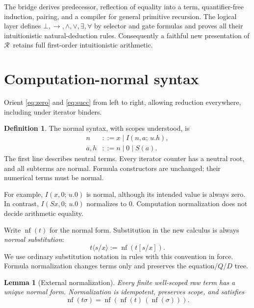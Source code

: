 \documentclass[11pt]{article}
\newtheorem{lemma}[theorem]{Lemma}
\theoremstyle{definition}
\newtheorem{definition}[theorem]{Definition}
\newcommand{\Raw}{\ensuremath{\mathcal R}}
\newcommand{\nf}[1]{\operatorname{nf}(#1)}
\newcommand{\I}[3]{I(#1,#2;\,#3)}
\newcommand{\bnf}{\mathrel{::=}}
\begin{document}
The bridge derives predecessor, reflection of equality into a term,
quantifier-free induction, pairing, and a compiler for general
primitive recursion. The logical layer defines
$\bot,\to,\land,\lor,\exists,\forall$ by selector and gate formulas and
proves all their intuitionistic natural-deduction rules.
Consequently a faithful new presentation of \Raw\ retains full
first-order intuitionistic arithmetic.

\section{Computation-normal syntax}
\label{sec:normal}

Orient \eqref{eq:zero} and \eqref{eq:succ} from left to right, allowing
reduction everywhere, including under iterator binders.

\begin{definition}
The normal syntax, with scopes understood, is
\[
 \begin{aligned}
 n&\bnf x\mid\I{n}{a}{u.h},\\
 a,h&\bnf n\mid0\mid S(a).
 \end{aligned}
\]
The first line describes neutral terms. Every iterator counter has a
neutral root, and all subterms are normal. Formula constructors are
unchanged; their numerical terms must be normal.
\end{definition}

For example, $\I{x}{0}{u.0}$ is normal, although its intended value is
always zero. In contrast, $\I{Sx}{0}{u.0}$ normalizes to $0$.
Computation normalization does not decide arithmetic equality.

Write $\nf{t}$ for the normal form. Substitution in the new calculus is
always \emph{normal substitution}:
\[
 t\langle s/x\rangle:=\nf{t[s/x]}.
\]
We use ordinary substitution notation in rules with this convention in
force. Formula normalization changes terms only and preserves the
equation/$Q$/$D$ tree.

\begin{lemma}[External normalization]
Every finite well-scoped raw term has a unique normal form.
Normalization is idempotent, preserves scope, and satisfies
\[
 \nf{t\sigma}=\nf{\nf{t}\,(\nf{\sigma})}.
 \tag{N}
\]
\end{lemma}
\end{document}
